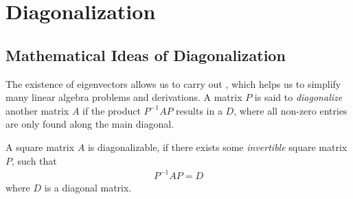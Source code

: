 \section{Diagonalization}

\subsection{Mathematical Ideas of Diagonalization}
\label{section:diagonalizeidea}
The existence of eigenvectors allows us to carry out , which helps us to simplify many linear algebra problems and derivations. A matrix $P$ is said to \textit{diagonalize} another matrix $A$ if the product $P^{-1}AP$ results in a  $D$, where all non-zero entries are only found along the main diagonal.
\begin{defn}[Diagonalization]
A square matrix $A$ is diagonalizable, if there exists some \textit{invertible} square matrix $P$, such that
\begin{align}
P^{-1}AP = D
\end{align}
where $D$ is a diagonal matrix.
\end{defn}
